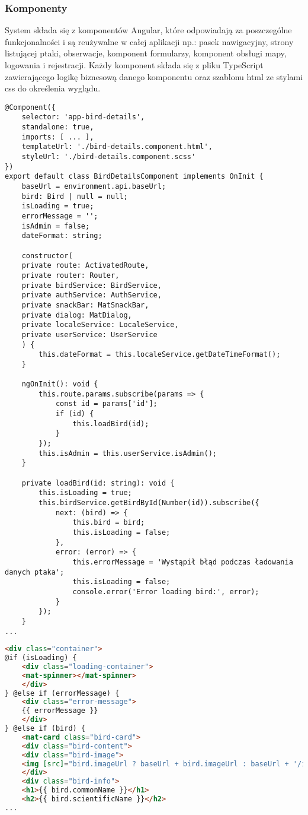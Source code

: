 \subsubsection{Komponenty}
System składa się z komponentów Angular, które odpowiadają za poszczególne funkcjonalności i są reużywalne w całej aplikacji np.: pasek nawigacyjny, strony listującej ptaki, obserwacje, komponent formularzy, komponent obsługi mapy, logowania i rejestracji.
Każdy komponent składa się z pliku TypeScript zawierającego logikę biznesową danego komponentu oraz szablonu html ze stylami css do określenia wyglądu.

\begin{lstlisting}[style=tsstyle, caption={Fragment kodu TypeScript komponentu}]
@Component({
	selector: 'app-bird-details',
	standalone: true,
	imports: [ ... ],
	templateUrl: './bird-details.component.html',
	styleUrl: './bird-details.component.scss'
})
export default class BirdDetailsComponent implements OnInit {
	baseUrl = environment.api.baseUrl;
	bird: Bird | null = null;
	isLoading = true;
	errorMessage = '';
	isAdmin = false;
	dateFormat: string;
	
	constructor(
	private route: ActivatedRoute,
	private router: Router,
	private birdService: BirdService,
	private authService: AuthService,
	private snackBar: MatSnackBar,
	private dialog: MatDialog,
	private localeService: LocaleService,
	private userService: UserService
	) {
		this.dateFormat = this.localeService.getDateTimeFormat();
	}
	
	ngOnInit(): void {
		this.route.params.subscribe(params => {
			const id = params['id'];
			if (id) {
				this.loadBird(id);
			}
		});
		this.isAdmin = this.userService.isAdmin();
	}
	
	private loadBird(id: string): void {
		this.isLoading = true;
		this.birdService.getBirdById(Number(id)).subscribe({
			next: (bird) => {
				this.bird = bird;
				this.isLoading = false;
			},
			error: (error) => {
				this.errorMessage = 'Wystąpił błąd podczas ładowania danych ptaka';
				this.isLoading = false;
				console.error('Error loading bird:', error);
			}
		});
	}
...
\end{lstlisting}

\begin{lstlisting}[language=HTML, caption={Fragment szablonu html komponentu}]
<div class="container">
@if (isLoading) {
	<div class="loading-container">
	<mat-spinner></mat-spinner>
	</div>
} @else if (errorMessage) {
	<div class="error-message">
	{{ errorMessage }}
	</div>
} @else if (bird) {
	<mat-card class="bird-card">
	<div class="bird-content">
	<div class="bird-image">
	<img [src]="bird.imageUrl ? baseUrl + bird.imageUrl : baseUrl + '/images/placeholder.jpg'" [alt]="bird.commonName">
	</div>
	<div class="bird-info">
	<h1>{{ bird.commonName }}</h1>
	<h2>{{ bird.scientificName }}</h2>
...
\end{lstlisting}

